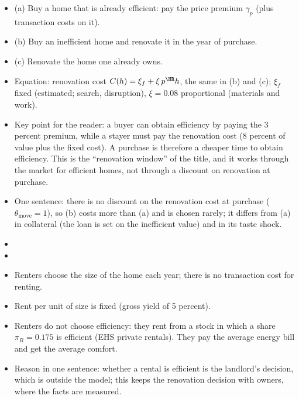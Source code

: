 \begin{itemize}
  \item (a) Buy a home that is already efficient: pay the price premium
    $\gamma_p$ (plus transaction costs on it).
  \item (b) Buy an inefficient home and renovate it in the year of
    purchase.
  \item (c) Renovate the home one already owns.
  \item Equation: renovation cost $C(h)=\xi_f+\xi\,p^{\NR}h$, the same in
    (b) and (c); $\xi_f$ fixed (estimated; search, disruption), $\xi=0.08$
    proportional (materials and work).
  \item Key point for the reader: a buyer can obtain efficiency by paying
    the 3 percent premium, while a stayer must pay the renovation cost
    (8 percent of value plus the fixed cost). A purchase is therefore a
    cheaper time to obtain efficiency. This is the ``renovation window'' of
    the title, and it works through the market for efficient homes, not
    through a discount on renovation at purchase.
  \item One sentence: there is no discount on the renovation cost at
    purchase ($\theta_{\mathrm{move}}=1$), so (b) costs more than (a) and is
    chosen rarely; it differs from (a) in collateral (the loan is set on
    the inefficient value) and in its taste shock.
  \item {}
  \item {}
\end{itemize}

\begin{itemize}
  \item Renters choose the size of the home each year; there is no
    transaction cost for renting.
  \item Rent per unit of size is fixed (gross yield of 5 percent).
  \item Renters do not choose efficiency: they rent from a stock in which a
    share $\pi_R=0.175$ is efficient (EHS private rentals). They pay the
    average energy bill and get the average comfort.
  \item Reason in one sentence: whether a rental is efficient is the
    landlord's decision, which is outside the model; this keeps the
    renovation decision with owners, where the facts are measured.
\end{itemize}

